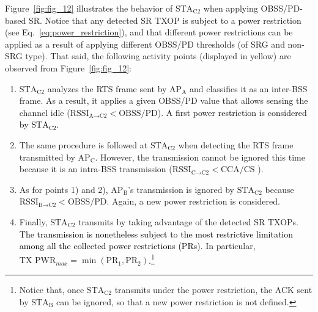 \documentclass[preprint,12pt]{elsarticle}
\theoremstyle{plain}
\begin{document}
Figure~\ref{fig:fig_12} illustrates the behavior of $\text{STA}_\text{C2}$ when applying OBSS/PD-based SR. Notice that any detected SR TXOP is subject to a power restriction (see Eq.~\eqref{eq:power_restriction}), and that different power restrictions can be applied as a result of applying different OBSS/PD thresholds (of SRG and non-SRG type). That said, the following activity points (displayed in yellow) are observed from Figure~\ref{fig:fig_12}:
\begin{enumerate}
	\item $\text{STA}_\text{C2}$ analyzes the RTS frame sent by $\text{AP}_\text{A}$ and classifies it as an inter-BSS frame. As a result, it applies a given OBSS/PD value that allows sensing the channel idle ($\text{RSSI}_{\text{A} \rightarrow \text{C2}} < \text{OBSS/PD}$). \textcolor{black}{A first power restriction is considered by $\text{STA}_\text{C2}$.}
	\item The same procedure is followed at $\text{STA}_\text{C2}$ when detecting the RTS frame transmitted by $\text{AP}_\text{C}$. However, the transmission cannot be ignored this time because it is an intra-BSS transmission ($\text{RSSI}_{\text{C} \rightarrow \text{C2}} < \text{CCA/CS}$ ).
	\item As for points 1) and 2), $\text{AP}_\text{B}$'s transmission is ignored by $\text{STA}_\text{C2}$ because $\text{RSSI}_{\text{B} \rightarrow \text{C2}} < \text{OBSS/PD}$. Again, a new power restriction is considered.
	\item Finally, $\text{STA}_\text{C2}$ transmits by taking advantage of the detected SR TXOPs. \textcolor{black}{The transmission is nonetheless subject to the most restrictive limitation among all the collected power restrictions (PRs)}. In particular, $\text{TX PWR}_{max} = \min(\text{PR}_1, \text{PR}_2)$.\footnote{Notice that, once $\text{STA}_\text{C2}$ transmits under the power restriction, the ACK sent by $\text{STA}_\text{B}$ can be ignored, so that a new power restriction is not defined.}
\end{enumerate}
\end{document}
